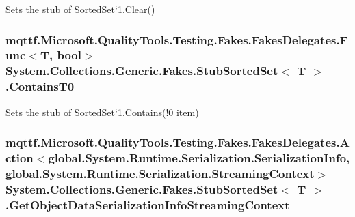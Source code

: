 Sets the stub of Sorted\-Set`1.\hyperlink{class_system_1_1_collections_1_1_generic_1_1_fakes_1_1_stub_sorted_set_3_01_t_01_4_a649b5664cbd33758bb866d58ad2696a9}{Clear()}

\hypertarget{class_system_1_1_collections_1_1_generic_1_1_fakes_1_1_stub_sorted_set_3_01_t_01_4_aee11b545275b68e5953910c9fd62d029}{
\subsubsection[{Contains\-T0}]{\setlength{\rightskip}{0pt plus 5cm}mqttf.\-Microsoft.\-Quality\-Tools.\-Testing.\-Fakes.\-Fakes\-Delegates.\-Func$<$T, bool$>$ System.\-Collections.\-Generic.\-Fakes.\-Stub\-Sorted\-Set$<$ T $>$.Contains\-T0}}\label{class_system_1_1_collections_1_1_generic_1_1_fakes_1_1_stub_sorted_set_3_01_t_01_4_aee11b545275b68e5953910c9fd62d029}


Sets the stub of Sorted\-Set`1.Contains(!0 item)

\hypertarget{class_system_1_1_collections_1_1_generic_1_1_fakes_1_1_stub_sorted_set_3_01_t_01_4_a63efa2ec1c7f383c0e0a0193a5c66b05}{
\subsubsection[{Get\-Object\-Data\-Serialization\-Info\-Streaming\-Context}]{\setlength{\rightskip}{0pt plus 5cm}mqttf.\-Microsoft.\-Quality\-Tools.\-Testing.\-Fakes.\-Fakes\-Delegates.\-Action$<$global.\-System.\-Runtime.\-Serialization.\-Serialization\-Info, global.\-System.\-Runtime.\-Serialization.\-Streaming\-Context$>$ System.\-Collections.\-Generic.\-Fakes.\-Stub\-Sorted\-Set$<$ T $>$.Get\-Object\-Data\-Serialization\-Info\-Streaming\-Context}}\label{class_system_1_1_collections_1_1_generic_1_1_fakes_1_1_stub_sorted_set_3_01_t_01_4_a63efa2ec1c7f383c0e0a0193a5c66b05}


